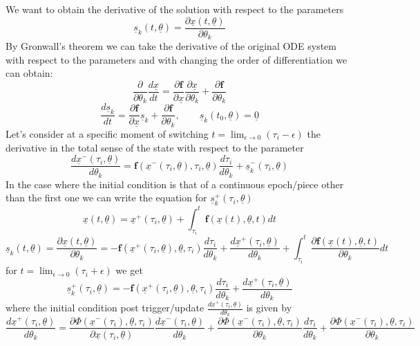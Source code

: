 \documentclass{article}
\begin{document}
We want to obtain the derivative of the solution with respect to the parameters
\[
\underline{s}_k(t,\underline{\theta}) = \frac{\partial\underline{x}(t, \underline{\theta})}{\partial \theta_k}
\]
By Gronwall's theorem we can take the derivative of the original ODE system with respect to the parameters and with changing the order of differentiation we can obtain:
\[
\frac{\partial}{\partial \theta_k} \frac{d \underline{x}}{d t}=\frac{\partial \boldsymbol{f}}{\partial \underline{x}} \frac{\partial \underline{x}}{\partial \theta_k}+\frac{\partial \boldsymbol{f}}{\partial \theta_k} 
\]\[
\frac{d \underline{s}_k}{d t}=\frac{\partial \boldsymbol{f}}{\partial \underline{x}} \underline{s}_k+\frac{\partial \boldsymbol{f}}{\partial \theta_k}, \qquad \underline{s}_k(t_0,\underline{\theta}) = \underline{0}
\]
Let's consider at a specific moment of switching $t = \lim_{\epsilon \rightarrow 0} (\tau_i - \epsilon)$ the derivative in the total sense of the state with respect to the parameter
\[
\frac{d \underline{x}^-(\tau_i, \underline{\theta})}{d \theta_k} = \boldsymbol{f}(\underline{x}^-(\tau_i, \underline{\theta}), \tau_i, \underline{\theta}) \frac{d\tau_i}{d\theta_k} + \underline{s}^-_k(\tau_i, \underline{\theta})
\]
In the case where the initial condition is that of a continuous epoch/piece other than the first one we can write the equation for $\underline{s}^+_k(\tau_i, \underline{\theta})$
\[
\underline{x}(t, \underline{\theta}) = \underline{x}^+(\tau_i, \underline{\theta}) + \int^t_{\tau_i}{\boldsymbol{f}\left(\underline{x}(t),\underline{\theta}, t\right)dt}
\]
\[
\underline{s}_k(t, \underline{\theta}) = \frac{\partial \underline{x}(t, \underline{\theta})}{\partial \theta_k} = -\boldsymbol{f}\left(\underline{x}^+(\tau_i, \underline{\theta}),\underline{\theta}, \tau_i\right) \frac{d\tau_i}{d\theta_k} + \frac{d \underline{x}^+(\tau_i, \underline{\theta})}{d\theta_k}+ \int^t_{\tau_i}{\frac{\partial \boldsymbol{f}\left(\underline{x}(t),\underline{\theta}, t\right)}{\partial \theta_k}dt}
\]
for $t = \lim_{\epsilon \rightarrow 0} (\tau_i + \epsilon)$ we get
\[
\underline{s}^+_k(\tau_i, \underline{\theta}) = -\boldsymbol{f}\left(\underline{x}^+(\tau_i, \underline{\theta}),\underline{\theta}, \tau_i\right) \frac{d\tau_i}{d\theta_k} + \frac{d \underline{x}^+(\tau_i, \underline{\theta})}{d\theta_k}
\]
where the initial condition post trigger/update $ \frac{d \underline{x}^+(\tau_i, \underline{\theta})}{d\theta_k}$ is given by
\[
\frac{d \underline{x}^+(\tau_i, \underline{\theta})}{d\theta_k} = \frac{\partial \Phi\left(\underline{x}^-(\tau_i),\underline{\theta}, \tau_i\right)}{\partial \underline{x}(\tau_i, \underline{\theta})}\frac{d \underline{x}^-(\tau_i, \underline{\theta})}{d \theta_k} + \frac{\partial \Phi\left(\underline{x}^-(\tau_i),\underline{\theta}, \tau_i\right)}{\partial\theta_k}\frac{d\tau_i}{d\theta_k}+\frac{\partial \Phi\left(\underline{x}^-(\tau_i),\underline{\theta}, \tau_i\right)}{\partial\theta_k}
\]
\end{document}
